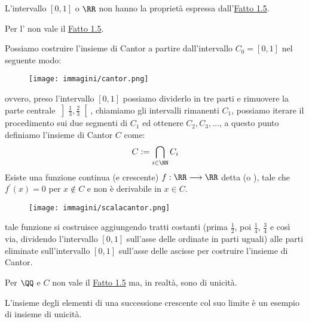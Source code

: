 \documentclass[11pt]{scrartcl}
\begin{document}
\begin{notexample}
L'intervallo $[0,1]$ o $\RR$ non hanno la proprietà espressa dall'\hyperref[unicità]{Fatto 1.5}.
\end{notexample}

\begin{notexampleb}
Per l' non vale il \hyperref[unicità]{Fatto 1.5}.
\end{notexampleb}

Possiamo costruire l'insieme di Cantor a partire dall'intervallo $C_0 = [0,1]$ nel seguente modo:

\begin{center}
	\begin{figure}[h]
		\centering
		\texttt{[image: immagini/cantor.png]}
	\end{figure}
\end{center}

ovvero, preso l'intervallo $[0,1]$ possiamo dividerlo in tre parti e rimuovere la parte centrale $\displaystyle\left]\frac 13, \frac 23\right[$, chiamiamo gli intervalli rimanenti $C_1$, possiamo iterare il procedimento sui due segmenti di $C_1$ ed ottenere $C_2,C_3,\ldots$, a questo punto 
definiamo l'insieme di Cantor $C$ come:
\[ C := \bigcap_{i \in \NN}C_i
	\]
Esiste una funzione continua (e crescente) $f : \RR \longrightarrow \RR$ detta  (o ), tale che $f^{\prime}(x) = 0$ per $x \not\in C$ e non è 
derivabile in $x \in C$.

\begin{center}
	\begin{figure}[h]
		\centering
		\texttt{[image: immagini/scalacantor.png]}
	\end{figure}
\end{center}

tale funzione si costruisce aggiungendo tratti costanti (prima $\displaystyle\frac 12$, poi $\displaystyle\frac 14$, $\displaystyle\frac 34$ e così via, dividendo l'intervallo $[0,1]$ sull'asse delle ordinate in parti uguali) alle parti eliminate sull'intervallo
$[0,1]$ sull'asse delle ascisse per costruire l'insieme di Cantor.

\begin{note}
Per $\QQ$ e $C$ non vale il \hyperref[unicità]{Fatto 1.5} ma, in realtà, sono di unicità.
\end{note}

\begin{exampleb}
L'insieme degli elementi di una successione crescente col suo limite è un esempio di insieme di unicità.
\end{exampleb}
\end{document}
